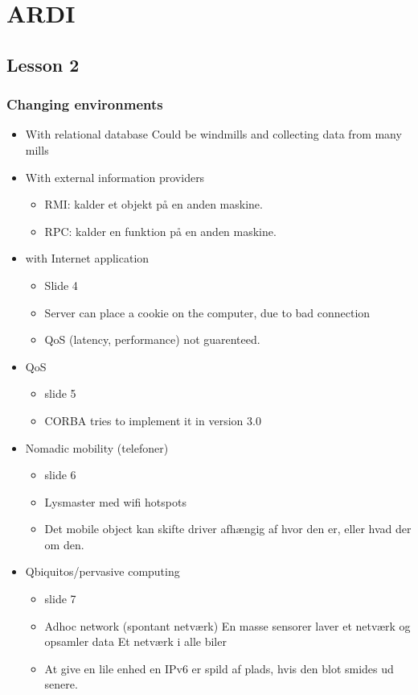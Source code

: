 \documentclass[oneside, 10pt]{memoir}
\begin{document}
\chapter{ARDI}

\section{Lesson 2}

\subsection{Changing environments}
\begin{itemize}
\item With relational database
\subitem Could be windmills and collecting data from many mills

\item With external information providers
	\begin{itemize}
	\item RMI: kalder et objekt på en anden maskine.
	\item RPC: kalder en funktion på en anden maskine.
	\end{itemize}

\item with Internet application
	\begin{itemize}
	\item[] Slide 4
	\item Server can place a cookie on the computer, due to bad connection
	\item QoS (latency, performance) not guarenteed. 
	\end{itemize}

\item QoS
	\begin{itemize}
	\item slide 5
	\item CORBA tries to implement it in version 3.0
	\end{itemize}

\item Nomadic mobility (telefoner)
	\begin{itemize}
	\item slide 6
	\item Lysmaster med wifi hotspots
	\item Det mobile object kan skifte driver afhængig af hvor den er, eller hvad der om den.
	\end{itemize}

\item Qbiquitos/pervasive computing
	\begin{itemize}
	\item slide 7
	\item Adhoc network (spontant netværk)
	\subitem En masse sensorer laver et netværk og opsamler data 	
	\subitem Et netværk i alle biler
	\item At give en lile enhed en IPv6 er spild af plads, hvis den blot smides ud senere.
	\end{itemize}
\end{itemize}
\end{document}
